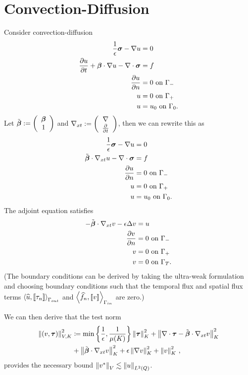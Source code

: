 \documentclass{article}
\begin{document}
\section{Convection-Diffusion}

Consider convection-diffusion
\begin{align*}
\frac{1}{\epsilon}\boldsymbol\sigma-\nabla u &=0\\
\frac{\partial u}{\partial t} + \boldsymbol\beta\cdot\nabla u - \nabla\cdot\boldsymbol\sigma &= f\\
\frac{\partial u}{\partial n} &= 0 \text{ on } \Gamma_-\\
u &= 0 \text{ on } \Gamma_+\\
u &= u_0 \text{ on } \Gamma_0.
\end{align*}
Let $\tilde{\boldsymbol\beta}:=\left( \begin{array}{c} \boldsymbol\beta\\ 1\\ \end{array} \right)$ and $\nabla_{xt}:=\left( \begin{array}{c} \nabla\\ \frac{\partial}{\partial t}\\ \end{array} \right)$, then we can rewrite this as
\begin{align*}
\frac{1}{\epsilon}\boldsymbol\sigma-\nabla u &=0\\
\tilde{\boldsymbol\beta}\cdot\nabla_{xt} u - \nabla\cdot\boldsymbol\sigma &= f\\
\frac{\partial u}{\partial n} &= 0 \text{ on } \Gamma_-\\
u &= 0 \text{ on } \Gamma_+\\
u &= u_0 \text{ on } \Gamma_0.
\end{align*}
The adjoint equation satisfies
\begin{align*}
-\tilde{\boldsymbol\beta}\cdot\nabla_{xt} v - \epsilon \Delta v &= u\\
\frac{\partial v}{\partial n} &= 0 \text{ on } \Gamma_-\\
v &= 0 \text{ on } \Gamma_+\\
v &= 0 \text{ on } \Gamma_T.
\end{align*}
(The boundary conditions can be derived by taking the ultra-weak formulation and choosing boundary conditions such that the temporal flux and spatial flux terms $\left\langle \widehat{u}, \left[ \![\tau_n]\! \right] \right\rangle_{\Gamma_{out}}$ and $\left\langle \widehat{f}_n,\left[ \![v]\! \right] \right\rangle_{\Gamma_{in}}$ are zero.)

We can then derive that the test norm
\begin{align}
\left\| \left( v,\boldsymbol\tau \right) \right\|_{V,K}^2 &\coloneqq
\min\left\{\frac{1}{\epsilon},\frac{1}{\mu(K)}\right\}\left\| \boldsymbol\tau \right\|_K^2
+ \left\| \nabla\cdot \boldsymbol\tau - \tilde{\boldsymbol\beta}\cdot\nabla_{xt} v \right\|_K^2 \nonumber\\
&+\left\| \tilde{\boldsymbol\beta}\cdot \nabla_{xt} v \right\|_K^2
+ \epsilon\left\| \nabla v \right\|_K^2
+ \left\| v \right\|^2_K\,,
\end{align}
provides the necessary bound $\left\| v^* \right\|_V \lesssim \left\| u \right\|_{L^2\left( Q \right)}$.
\end{document}
